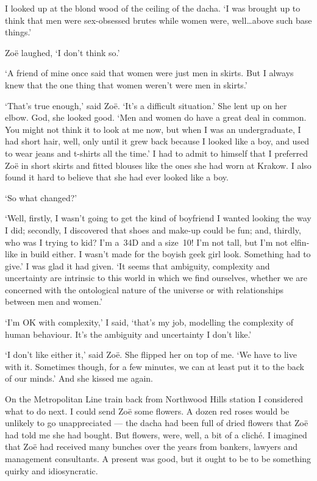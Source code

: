 I looked up at the blond wood of the ceiling of the dacha. `I was
brought up to think that men were sex-obsessed brutes while women
were, well\dots above such base things.'

Zoë laughed, `I don't think so.'

`A friend of mine once said that women were just men in skirts. But
I always knew that the one thing that women weren't were men in
skirts.'

`That's true enough,' said Zoë. `It's a difficult situation.'
She lent up on her elbow. God, she looked good. `Men and women do
have a great deal in common. You might not think it to look at me
now, but when I was an undergraduate, I had short hair, well, only until it grew back because I looked like a boy, and used to
wear jeans and t-shirts all the time.' I had to admit to himself
that I preferred Zoë in short skirts and fitted blouses like the ones she had worn at Krakow. I also found it hard to believe that she had ever looked like a boy.

`So what changed?'

`Well, firstly, I wasn't going to get the kind of boyfriend I wanted
looking the way I did; secondly, I discovered that shoes and make-up
could be fun; and, thirdly, who was I trying to kid? I'm a~34D and a
size~10! I'm not tall, but I'm not elfin-like in build either. I
wasn't made for the boyish geek girl look. Something had to give.' I
was glad it had given. `It seems that ambiguity, complexity and
uncertainty are intrinsic to this world in which we find ourselves,
whether we are concerned with the ontological nature of the universe
or with relationships between men and women.'

`I'm OK with complexity,' I said, `that's my job, modelling the
complexity of human behaviour. It's the ambiguity and uncertainty I
don't like.'

`I don't like either it,' said Zoë. She flipped her on top of
me. `We have to live with it. Sometimes though, for a few minutes,
we can at least put it to the back of our minds.' And she kissed me
again.

On the Metropolitan Line train back from Northwood Hills station I
considered what to do next. I could send Zoë some flowers. A
dozen red roses would be unlikely to go unappreciated --- the dacha
had been full of dried flowers that Zoë had told me she had
bought. But flowers, were, well, a bit of a cliché. I imagined
that Zoë had received many bunches over the years from bankers,
lawyers and management consultants. A present was good, but it ought
to be to be something quirky and idiosyncratic.

